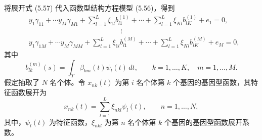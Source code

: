 将展开式 (5.57) 代入函数型结构方程模型 (5.56)，得到
\begin{equation}
\begin{aligned}
&y_1\gamma_{11}+\cdots y_M\gamma_{M1}
+\sum_{l=1}^L\xi_{1l}b_{l1}^{(1)}+\cdots+\sum_{l=1}^L\xi_{Kl}b_{lK}^{(1)}+e_1=0,\\
&\hspace{13em}\vdots\\
&y_1\gamma_{1M}+\cdots y_M\gamma_{MM}
+\sum_{l=1}^L\xi_{1l}b_{l1}^{(M)}+\cdots+\sum_{l=1}^L\xi_{Kl}b_{lK}^{(M)}+e_M=0,
\end{aligned}
\tag{5.58}
\end{equation}
其中
\[
b_{lk}^{(m)}(s)=\int_T\beta_{km}(t)\psi_l(t)\,dt,\qquad
k=1,\ldots,K,\quad m=1,\ldots,M.
\]
假定抽取了 $N$ 名个体。令 $x_{nk}(t)$ 为第 $i$ 名个体第 $k$ 个基因的基因型函数，其特征函数展开为
\begin{equation}
x_{nk}(t)=\sum_{l=1}^L\xi_{nkl}\psi_l(t),\qquad n=1,\ldots,N,
\tag{5.59}
\end{equation}
其中，$\psi_l(t)$ 为特征函数，$\xi_{nkl}$ 为第 $n$ 名个体第 $k$ 个基因的基因型函数展开系数。

